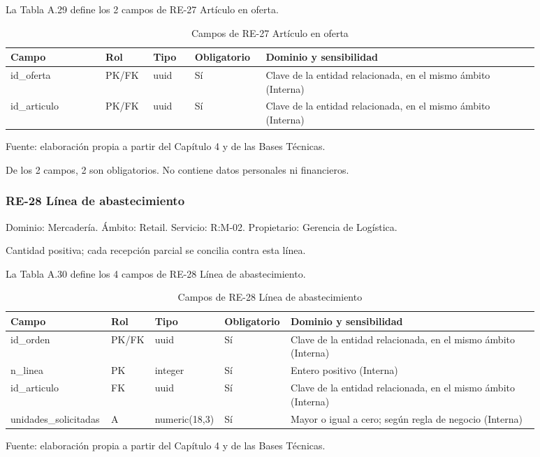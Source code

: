 \documentclass[11pt]{article}
\begin{document}
La Tabla A.29 define los 2 campos de RE-27 Artículo en oferta.

\begin{table}[htbp]
\caption{Campos de RE-27 Artículo en oferta}\label{tab:d_re27}
\centering
\begin{tabular}{@{}p{0.167\linewidth}p{0.070\linewidth}p{0.079\linewidth}p{0.097\linewidth}p{0.465\linewidth}@{}}
\toprule Campo & Rol & Tipo & Obligatorio & Dominio y sensibilidad \\
\midrule
id\_oferta & PK/FK & uuid & Sí & Clave de la entidad relacionada, en el mismo ámbito (Interna) \\
id\_articulo & PK/FK & uuid & Sí & Clave de la entidad relacionada, en el mismo ámbito (Interna) \\
\bottomrule
\end{tabular}
\par\smallskip
{\raggedright Fuente: elaboración propia a partir del Capítulo 4 y de las Bases Técnicas.\par}
\end{table}


De los 2 campos, 2 son obligatorios. No contiene datos personales ni financieros.

\subsubsection{RE-28 Línea de abastecimiento}

Dominio: Mercadería. Ámbito: Retail. Servicio: R:M-02. Propietario: Gerencia de Logística.

Cantidad positiva; cada recepción parcial se concilia contra esta línea.

La Tabla A.30 define los 4 campos de RE-28 Línea de abastecimiento.

\clearpage

\begin{table}[htbp]
\caption{Campos de RE-28 Línea de abastecimiento}\label{tab:d_re28}
\centering
\begin{tabular}{@{}p{0.167\linewidth}p{0.070\linewidth}p{0.079\linewidth}p{0.097\linewidth}p{0.465\linewidth}@{}}
\toprule Campo & Rol & Tipo & Obligatorio & Dominio y sensibilidad \\
\midrule
id\_orden & PK/FK & uuid & Sí & Clave de la entidad relacionada, en el mismo ámbito (Interna) \\
n\_linea & PK & integer & Sí & Entero positivo (Interna) \\
id\_articulo & FK & uuid & Sí & Clave de la entidad relacionada, en el mismo ámbito (Interna) \\
unidades\_solicitadas & A & numeric(18,3) & Sí & Mayor o igual a cero; según regla de negocio (Interna) \\
\bottomrule
\end{tabular}
\par\smallskip
{\raggedright Fuente: elaboración propia a partir del Capítulo 4 y de las Bases Técnicas.\par}
\end{table}
\end{document}
